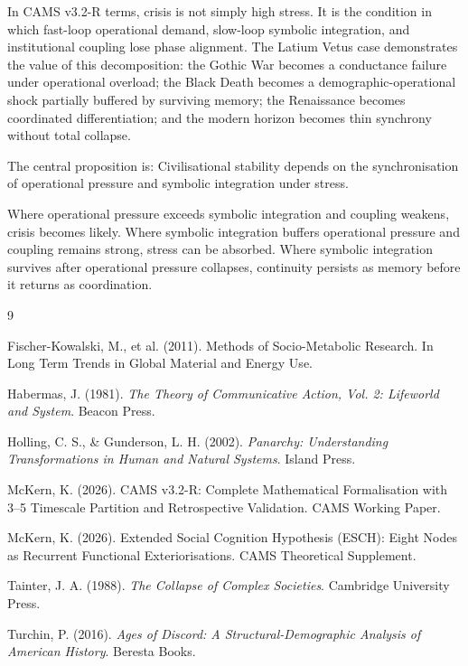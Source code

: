 \documentclass[11pt,a4paper]{article}
\begin{document}
In CAMS v3.2-R terms, crisis is not simply high stress. It is the condition in which fast-loop operational demand, slow-loop symbolic integration, and institutional coupling lose phase alignment. The Latium Vetus case demonstrates the value of this decomposition: the Gothic War becomes a conductance failure under operational overload; the Black Death becomes a demographic-operational shock partially buffered by surviving memory; the Renaissance becomes coordinated differentiation; and the modern horizon becomes thin synchrony without total collapse.

The central proposition is: Civilisational stability depends on the synchronisation of operational pressure and symbolic integration under stress.

Where operational pressure exceeds symbolic integration and coupling weakens, crisis becomes likely. Where symbolic integration buffers operational pressure and coupling remains strong, stress can be absorbed. Where symbolic integration survives after operational pressure collapses, continuity persists as memory before it returns as coordination.


\begin{thebibliography}{9}

 Fischer-Kowalski, M., et al. (2011). Methods of Socio-Metabolic Research. In Long Term Trends in Global Material and Energy Use.

 Habermas, J. (1981). \emph{The Theory of Communicative Action, Vol. 2: Lifeworld and System}. Beacon Press.

 Holling, C. S., \& Gunderson, L. H. (2002). \emph{Panarchy: Understanding Transformations in Human and Natural Systems}. Island Press.

 McKern, K. (2026). CAMS v3.2-R: Complete Mathematical Formalisation with 3--5 Timescale Partition and Retrospective Validation. CAMS Working Paper.

 McKern, K. (2026). Extended Social Cognition Hypothesis (ESCH): Eight Nodes as Recurrent Functional Exteriorisations. CAMS Theoretical Supplement.

 Tainter, J. A. (1988). \emph{The Collapse of Complex Societies}. Cambridge University Press.

 Turchin, P. (2016). \emph{Ages of Discord: A Structural-Demographic Analysis of American History}. Beresta Books.

\end{thebibliography}
\end{document}
